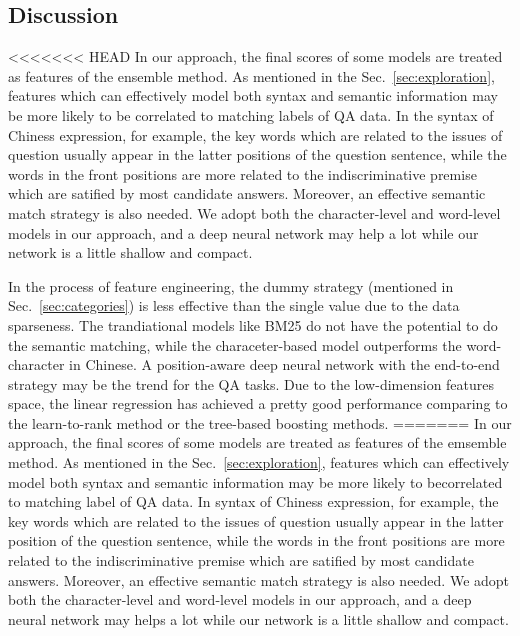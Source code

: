 \documentclass{llncs}
\begin{document}
\begin{table}[!htbp]
\begin{table}[!htbp]
\begin{table}[!htbp]
\begin{table}[!htbp]
\subsection{Discussion}
\label{discussion}

<<<<<<< HEAD
In our approach, the final scores of some models are treated as features of the ensemble method. As mentioned in the Sec.~\ref{sec:exploration}, features which can effectively model both syntax and semantic information may be more likely to be correlated to matching labels of QA data. In the syntax of Chiness expression, for example, the key words which are related to the issues of question usually appear in the latter positions of the question sentence, while the words in the front positions are more related to the indiscriminative premise which are satified by most candidate answers. Moreover, an effective semantic match strategy is also needed. We adopt both the character-level and word-level models in our approach, and a deep neural network may help a lot while our network is a little shallow and compact.

In the process of feature engineering, the dummy  strategy (mentioned in Sec.~\ref{sec:categories}) is less effective than the single value due to the data sparseness. The trandiational models like BM25 do not have the potential to do the semantic matching, while the characeter-based model outperforms the word-character in Chinese. A position-aware deep neural network with the end-to-end strategy may be the trend for the QA tasks. Due to the low-dimension features space, the linear regression has achieved a pretty good performance comparing to the learn-to-rank method or the tree-based boosting methods.
=======
In our approach, the final scores of some models are treated as features of the emsemble method. As mentioned in the Sec.~\ref{sec:exploration}, features which can effectively model both syntax and semantic information may be more likely {\color{red}to be}correlated to matching label of QA data. In syntax of Chiness {\color{red}expression}, for example, the key words which are related to the issues of question usually {\color{red}appear} in the latter position of the question sentence, while the words in the front positions are more related to the indiscriminative premise which are satified by most candidate answers. Moreover, {\color{red}an} effective semantic match strategy is also needed. We adopt both the character-level and word-level models in our approach, and a deep neural network may helps a lot while our network is a little shallow and compact.


\end{table}
\end{table}
\end{table}
\end{table}
\end{document}
